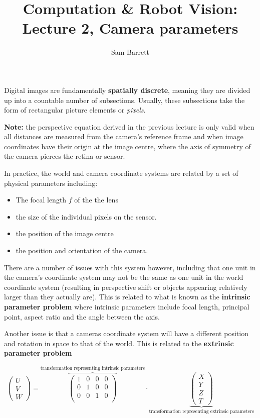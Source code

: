 \documentclass{article}
\title{Computation \& Robot Vision: Lecture 2, Camera parameters}
\author{Sam Barrett}
\begin{document}
\maketitle

Digital images are fundamentally \textbf{spatially discrete}, meaning they are divided up into a countable number of subsections. Usually, these subsections take the form of rectangular picture elements or \textit{pixels}.

\textbf{Note:} the perspective equation derived in the previous lecture is only valid when all distances are measured from the camera's reference frame and when image coordinates have their origin at the image centre, where the axis of symmetry of the camera pierces the retina or sensor.

In practice, the world and camera coordinate systems are related by a set of physical parameters including:

\begin{itemize}
  \item The focal length $f$ of the the lens
  \item the size of the individual pixels on the sensor.
  \item the position of the image centre
  \item the position and orientation of the camera.
\end{itemize}

There are a number of issues with this system however, including that one unit in the camera's coordinate system may not be the same as one unit in the world coordinate system (resulting in perspective shift or objects appearing relatively larger than they actually are). This is related to what is known as the \textbf{intrinsic parameter problem} where intrinsic parameters include focal length, principal point, aspect ratio and the angle between the axis.

Another issue is that a cameras coordinate system will have a different position and rotation in space to that of the world. This is related to the \textbf{extrinsic parameter problem}

\[
  \begin{pmatrix}
    U \\ V \\ W
  \end{pmatrix} =
  \overbrace{\begin{pmatrix}
    1&0&0&0\\
    0&1&0&0\\
    0&0&1&0\\
  \end{pmatrix}}^{\text{transformation representing intrinsic parameters}}
\cdot
  \underbrace{\begin{pmatrix}
    X \\ Y \\ Z \\ T
  \end{pmatrix}}_{\text{transformation representing extrinsic parameters}}
\]
\end{document}
